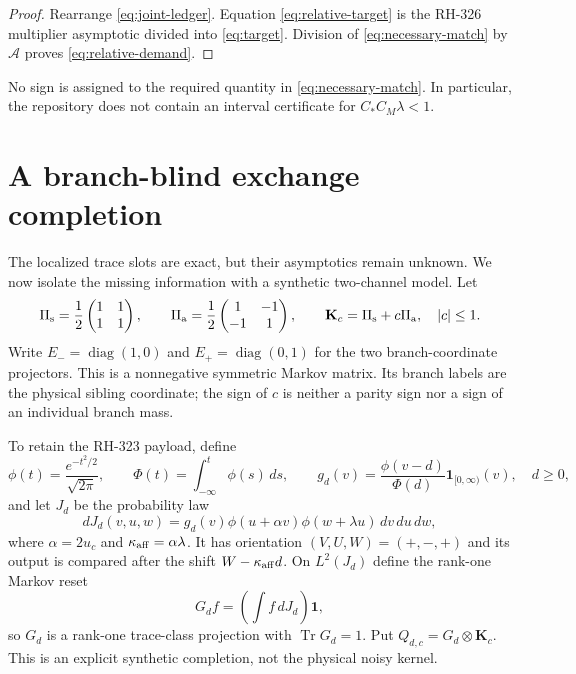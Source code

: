 \documentclass[11pt]{article}
\theoremstyle{remark}
\newcommand{\Tr}{\operatorname{Tr}}
\newcommand{\cA}{\mathcal A}
\newcommand{\bK}{\mathbf K}
\begin{document}
\begin{proof}
Rearrange \eqref{eq:joint-ledger}.  Equation
\eqref{eq:relative-target} is the RH-326 multiplier asymptotic divided into
\eqref{eq:target}.  Division of \eqref{eq:necessary-match} by $\cA$ proves
\eqref{eq:relative-demand}.
\end{proof}

No sign is assigned to the required quantity in
\eqref{eq:necessary-match}.  In particular, the repository does not contain
an interval certificate for $C_*C_M\lambda<1$.

\section{A branch-blind exchange completion}

The localized trace slots are exact, but their asymptotics remain unknown.
We now isolate the missing information with a synthetic two-channel model.
Let
\begin{equation}
 \Pi_{\rm s}=\frac12\begin{pmatrix}1&1\\1&1\end{pmatrix},
 \qquad
 \Pi_{\rm a}=\frac12\begin{pmatrix}1&-1\\-1&1\end{pmatrix},
 \qquad
 \bK_c=\Pi_{\rm s}+c\Pi_{\rm a},\quad |c|\le1.
 \label{eq:exchange-matrix}
\end{equation}
Write $E_-=\operatorname{diag}(1,0)$ and
$E_+=\operatorname{diag}(0,1)$ for the two branch-coordinate projectors.
This is a nonnegative symmetric Markov matrix.  Its branch labels are the
physical sibling coordinate; the sign of $c$ is neither a parity sign nor a
sign of an individual branch mass.

To retain the RH-323 payload, define
\begin{equation}
 \phi(t)=\frac{e^{-t^2/2}}{\sqrt{2\pi}},
 \qquad
 \Phi(t)=\int_{-\infty}^t\phi(s)\,ds,
 \qquad
 g_d(v)=\frac{\phi(v-d)}{\Phi(d)}\mathbf1_{[0,\infty)}(v),
 \quad d\ge0,
 \label{eq:affine-ingredients}
\end{equation}
and let $J_d$ be the probability law
\begin{equation}
 dJ_d(v,u,w)
 =g_d(v)\phi(u+\alpha v)\phi(w+\lambda u)\,dv\,du\,dw,
 \label{eq:affine-law}
\end{equation}
where $\alpha=2u_c$ and $\kappa_{\rm aff}=\alpha\lambda$.  It has orientation
$(V,U,W)=(+,-,+)$ and its output is compared after the shift
$W-\kappa_{\rm aff}d$.  On $L^2(J_d)$ define the rank-one Markov reset
\begin{equation}
 G_df=\left(\int f\,dJ_d\right)\mathbf1,
 \label{eq:reset}
\end{equation}
so $G_d$ is a rank-one trace-class projection with $\Tr G_d=1$.
Put $Q_{d,c}=G_d\otimes\bK_c$.  This is an explicit synthetic
completion, not the physical noisy kernel.
\end{document}
